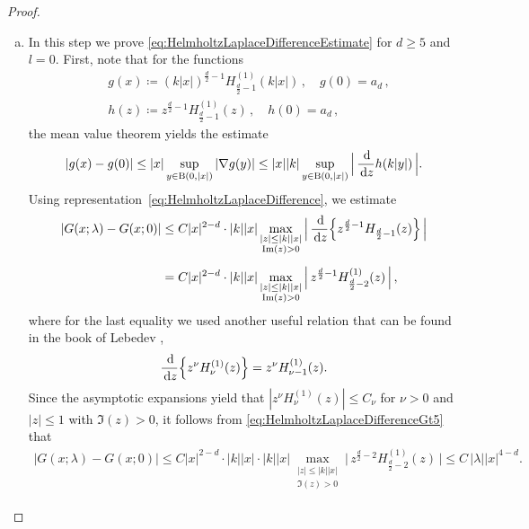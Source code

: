 \begin{proof}
\begin{enumerate}[(a)]
  \item In this step we prove \eqref{eq:HelmholtzLaplaceDifferenceEstimate} for $d \geq 5$ and $l = 0$. 
    First, note that for the functions
    \begin{align*}
      &g(x) \coloneqq (k|x|)^{\frac{d}{2} - 1} H_{\frac{d}{2} - 1}^{(1)}(k|x|)\,, \quad g(0) = a_d\,, \\
      &h(z) \coloneqq z^{\frac{d}{2} - 1} H_{\frac{d}{2} - 1}^{(1)}(z)\,, \quad h(0) = a_d\,,
    \end{align*}
    the mean value theorem yields the estimate
    \begin{align*}
      |g(x) - g(0)| \leq |x| \sup_{y \in \mathrm{B}(0,|x|)} |\nabla g(y)| \leq |x| |k| \sup_{y \in \mathrm{B}(0,|x|)}  \Big| \, \frac{\, {\operatorname{d}\!{}} }{\, {\operatorname{d}\!{z}}} h (k|y|)\,\Big|.
    \end{align*}
    Using representation~\eqref{eq:HelmholtzLaplaceDifference}, we estimate
    \begin{align}
      |G(x; \lambda) - G(x; 0) |
      &\leq C |x|^{2 - d} \cdot |k| |x| \max_{\substack{|z| \leq |k| |x| \\ \operatorname{Im}(z) > 0}} \Big|\, \frac{\, {\operatorname{d}\!{}}}{\, {\operatorname{d}\!{z}}} \Big\{ z^{\frac{d}{2} - 1} H_{\frac{d}{2} - 1}(z) \Big\} \,\Big| \nonumber\\[0.5em]
      &= C |x|^{2 - d} \cdot |k| |x| \max_{\substack{|z| \leq |k||x| \\ \operatorname{Im}(z) > 0}} \Big|\,z^{\frac{d}{2} - 1} H_{\frac{d}{2} - 2}^{(1)}(z) \,\Big| \, , \label{eq:HelmholtzLaplaceDifferenceGt5}
    \end{align}
    where for the last equality we used another useful relation that can be found in the book of Lebedev \cite[Eq.\@~(5.6.3)]{lebedev},
    \begin{align}
      \frac{\, {\operatorname{d}\!{}}}{\, {\operatorname{d}\!{z}}} \Big\{ z^\nu H_\nu^{(1)}(z) \Big\} = z^\nu H_{\nu - 1}^{(1)}(z).
    \end{align}
    Since the asymptotic expansions yield that $|z^{\nu} H_\nu^{(1)}(z)| \leq C_\nu$ for $\nu > 0$ and $|z| \leq 1$ with $\Im(z) > 0$, it follows from \eqref{eq:HelmholtzLaplaceDifferenceGt5} that
    \begin{align*}
      |G(x;\lambda) - G(x; 0)| \leq C |x|^{2 - d} \cdot |k| |x| \cdot |k| |x| \max_{\substack{|z| \leq |k||x| \\ \Im(z) > 0}} \Big|\,z^{\frac{d}{2} - 2} H_{\frac{d}{2} - 2}^{(1)}(z) \, \Big|
      \leq C \, |\lambda| |x|^{4 - d}.
    \end{align*}
    

\end{enumerate}
\end{proof}
